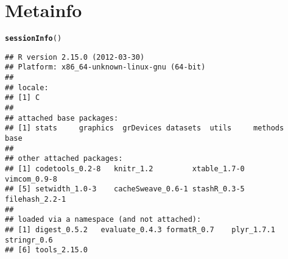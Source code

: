 \documentclass{article}\usepackage{graphicx, color}
\makeatletter
\newcommand{\hlfunctioncall}[1]{\textcolor[rgb]{0.501960784313725,0,0.329411764705882}{\textbf{#1}}}%
\newenvironment{kframe}{%
 \def\at@end@of@kframe{}%
 \ifinner\ifhmode%
  \def\at@end@of@kframe{\end{minipage}}%
  \begin{minipage}{\columnwidth}%
 \fi\fi%
 \def\FrameCommand##1{\hskip\@totalleftmargin \hskip-\fboxsep
 \colorbox{shadecolor}{##1}\hskip-\fboxsep
     \hskip-\linewidth \hskip-\@totalleftmargin \hskip\columnwidth}%
 \MakeFramed {\advance\hsize-\width
   \@totalleftmargin\z@ \linewidth\hsize
   \@setminipage}}%
 {\par\unskip\endMakeFramed%
 \at@end@of@kframe}
\newenvironment{knitrout}{}{} %
\makeatother
\begin{document}
\pagebreak
\section{Metainfo}
\begin{knitrout}
\color{fgcolor}\begin{kframe}
\begin{alltt}
\hlfunctioncall{sessionInfo}()
\end{alltt}
\begin{verbatim}
## R version 2.15.0 (2012-03-30)
## Platform: x86_64-unknown-linux-gnu (64-bit)
## 
## locale:
## [1] C
## 
## attached base packages:
## [1] stats     graphics  grDevices datasets  utils     methods   base     
## 
## other attached packages:
## [1] codetools_0.2-8   knitr_1.2         xtable_1.7-0      vimcom_0.9-8     
## [5] setwidth_1.0-3    cacheSweave_0.6-1 stashR_0.3-5      filehash_2.2-1   
## 
## loaded via a namespace (and not attached):
## [1] digest_0.5.2   evaluate_0.4.3 formatR_0.7    plyr_1.7.1     stringr_0.6   
## [6] tools_2.15.0
\end{verbatim}
\end{kframe}
\end{knitrout}
\end{document}
